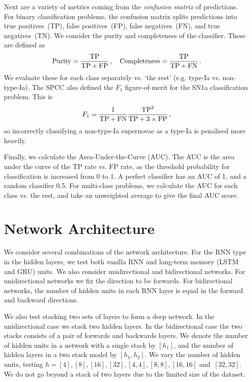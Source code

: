 \documentclass[twocolumn]{aastex61}
\begin{document}
Next are a variety of metrics coming from the {\em confusion matrix} of predictions.  For binary classification problems, the confusion matrix splits predictions into true positives~(TP), false positives~(FP), false negatives~(FN), and true negatives~(TN). We consider the purity and completeness of the classifier. These are defined as 
\begin{equation}
{\rm Purity} = \frac{{\rm TP}}{{\rm TP}+{\rm FP}}\,, \quad {\rm Completeness} = \frac{{\rm TP}}{{\rm TP}+{\rm FN}}\,.
\end{equation}
We evaluate these for each class separately vs. `the rest' (e.g. type-Ia vs. non-type-Ia). The SPCC also defined the $F_1$ figure-of-merit for the SN1a classification problem. This is 
\begin{equation}
F_1 = \frac{1}{{\rm TP}+{\rm FN}} \frac{{\rm TP}^2}{{\rm TP}+3 \times {\rm FP}}\,,
\end{equation}
so incorrectly classifying a non-type-Ia supernovae as a type-Ia is penalised more heavily.

Finally, we calculate the Area-Under-the-Curve (AUC). The AUC is the area under the curve of the TP rate vs. FP rate, as the threshold probability for classification is increased from 0 to 1. A perfect classifier has an AUC of 1, and a random classifier 0.5. For multi-class problems, we calculate the AUC for each class vs. the rest, and take an unweighted average to give the final AUC score. 

\section{Network Architecture}

We consider several combinations of the network architecture. For the RNN type in the hidden layers, we test both vanilla RNN and long-term memory (LSTM and GRU) units. We also consider unidirectional and bidirectional networks. For unidirectional networks we fix the direction to be forwards. For bidirectional networks, the number of hidden units in each RNN layer is equal in the forward and backward directions. 

We also test stacking two sets of layers to form a deep network.  In the unidirectional case we stack two hidden layers. In the bidirectional case the two stacks consists  of a pair  of forwards and backwards layers.  We denote the number of hidden units in a network with a  single stack by $[h_1]$, and the number of hidden layers in a two stack model by $[h_1, h_2]$. We vary the number of hidden units, testing $h=[4],[8],[16],[32],[4,4],[8,8],[16,16]$ and~$[32,32]$. We do not go beyond a stack of two layers due to the limited size of the dataset. 
\end{document}
